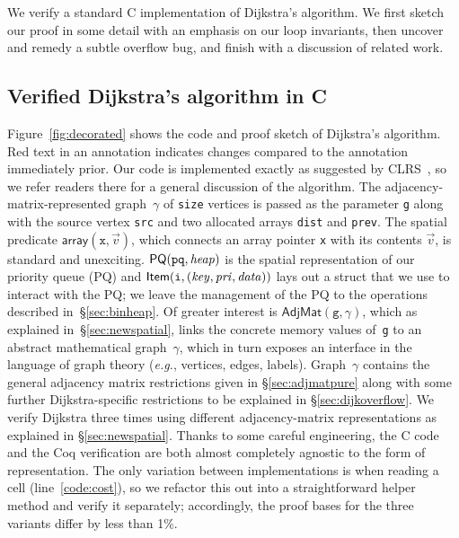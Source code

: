 We verify a standard C implementation of Dijkstra's algorithm.
We first sketch our proof in some detail with an emphasis on our loop invariants,
then uncover and remedy a subtle overflow bug, and finish with a discussion
of related work.

\subsection{Verified Dijkstra's algorithm in C}
\label{sec:dijkoverview}

Figure~\ref{fig:decorated} shows the code and proof
sketch of Dijkstra's algorithm.
{\color{red}Red} text in an annotation indicates changes compared to the
annotation immediately prior.
Our code is implemented exactly
as suggested by CLRS~\cite{clrs}, so we refer readers there for a
general discussion of the algorithm.
The adjacency-matrix-represented graph~$\gamma$ of \texttt{size} vertices
is passed as the parameter \texttt{g} along with the source vertex \texttt{src}
and two allocated arrays \texttt{dist} and \texttt{prev}.
The spatial predicate $\mathsf{array}(\texttt{x},\vec{v})$, which connects
an array pointer \texttt{x} with its contents $\vec{v}$, is standard and unexciting.
$\mathsf{PQ}(\texttt{pq},\mathit{heap})$ is the spatial
representation of our priority queue (PQ) and
$\mathsf{Item}(\texttt{i},\mathit{(key, pri, data)})$
lays out a struct that we use to interact with the PQ;
we leave the management of the PQ to the operations described in~\S\ref{sec:binheap}.
Of greater interest is $\mathsf{AdjMat}(\texttt{g},\gamma)$, which as explained in~\S\ref{sec:newspatial}, links 
the concrete memory values of~\texttt{g} to an abstract mathematical
graph~$\gamma$, which in turn exposes an interface in the
language of graph theory (\emph{e.g.}, vertices, edges, labels).  Graph~$\gamma$ contains 
the general adjacency matrix restrictions given in \S\ref{sec:adjmatpure} along with some further
Dijkstra-specific restrictions to be explained in \S\ref{sec:dijkoverflow}.
We verify Dijkstra
three times using different adjacency-matrix representations as explained in \S\ref{sec:newspatial}.
Thanks to some careful engineering, the C code and
the Coq verification are both almost completely agnostic to
the form of representation. The only variation between implementations
is when reading a cell (line~\ref{code:cost}), so we
refactor this out into a straightforward helper method and
verify it separately; accordingly, the proof bases for the three variants differ by less than 1\%.

